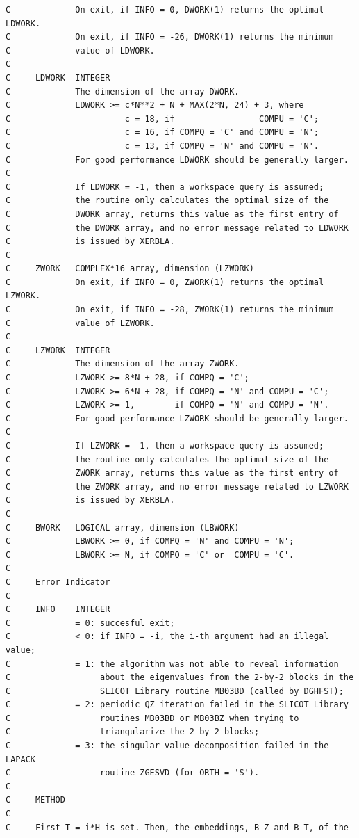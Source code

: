 \documentclass[a4paper,10pt]{article}
\begin{document}
\begin{verbatim}
C             On exit, if INFO = 0, DWORK(1) returns the optimal LDWORK.
C             On exit, if INFO = -26, DWORK(1) returns the minimum
C             value of LDWORK.
C
C     LDWORK  INTEGER
C             The dimension of the array DWORK.
C             LDWORK >= c*N**2 + N + MAX(2*N, 24) + 3, where
C                       c = 18, if                 COMPU = 'C';
C                       c = 16, if COMPQ = 'C' and COMPU = 'N';
C                       c = 13, if COMPQ = 'N' and COMPU = 'N'.
C             For good performance LDWORK should be generally larger.
C
C             If LDWORK = -1, then a workspace query is assumed;
C             the routine only calculates the optimal size of the
C             DWORK array, returns this value as the first entry of
C             the DWORK array, and no error message related to LDWORK
C             is issued by XERBLA.
C
C     ZWORK   COMPLEX*16 array, dimension (LZWORK)
C             On exit, if INFO = 0, ZWORK(1) returns the optimal LZWORK.
C             On exit, if INFO = -28, ZWORK(1) returns the minimum
C             value of LZWORK.
C
C     LZWORK  INTEGER
C             The dimension of the array ZWORK.
C             LZWORK >= 8*N + 28, if COMPQ = 'C';
C             LZWORK >= 6*N + 28, if COMPQ = 'N' and COMPU = 'C';
C             LZWORK >= 1,        if COMPQ = 'N' and COMPU = 'N'.
C             For good performance LZWORK should be generally larger.
C
C             If LZWORK = -1, then a workspace query is assumed;
C             the routine only calculates the optimal size of the
C             ZWORK array, returns this value as the first entry of
C             the ZWORK array, and no error message related to LZWORK
C             is issued by XERBLA.
C
C     BWORK   LOGICAL array, dimension (LBWORK)
C             LBWORK >= 0, if COMPQ = 'N' and COMPU = 'N';
C             LBWORK >= N, if COMPQ = 'C' or  COMPU = 'C'.
C
C     Error Indicator
C
C     INFO    INTEGER
C             = 0: succesful exit;
C             < 0: if INFO = -i, the i-th argument had an illegal value;
C             = 1: the algorithm was not able to reveal information
C                  about the eigenvalues from the 2-by-2 blocks in the
C                  SLICOT Library routine MB03BD (called by DGHFST);
C             = 2: periodic QZ iteration failed in the SLICOT Library
C                  routines MB03BD or MB03BZ when trying to
C                  triangularize the 2-by-2 blocks;
C             = 3: the singular value decomposition failed in the LAPACK
C                  routine ZGESVD (for ORTH = 'S').
C
C     METHOD
C
C     First T = i*H is set. Then, the embeddings, B_Z and B_T, of the

\end{verbatim}
\end{document}
